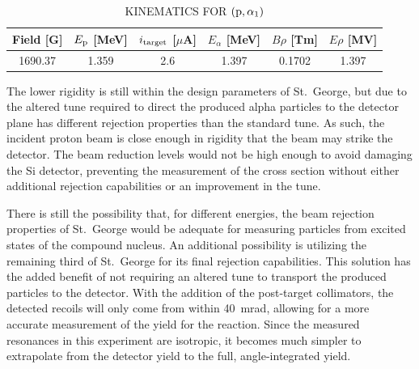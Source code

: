 \begin{table}[h]
    \begin{center}
        \caption{KINEMATICS FOR $({\rm p},\alpha_1)$}
        \label{tab:alpha-one}
        \begin{tabular}{cccccc}
            \toprule
            \midrule
            \textbf{Field [G]} & \textbf{$E_{\rm p}$ [MeV]} &
                \textbf{$i_{\rm target}$ [$\mu$A]} &
                \textbf{$E_{\alpha}$ [MeV]} & \textbf{$B\rho$ [Tm]} &
                \textbf{$E\rho$ [MV]} \\
            \midrule
                1690.37 & 1.359 & 2.6 & 1.397 & 0.1702 & 1.397 \\
            \bottomrule
        \end{tabular}
    \end{center}
\end{table}

The lower rigidity is still within the design parameters of St.\ George,
but due to the altered tune required to direct the produced alpha
particles to the detector plane has different rejection properties than
the standard tune. As such, the incident proton beam is close enough in
rigidity that the beam may strike the detector. The beam reduction
levels would not be high enough to avoid damaging the Si detector,
preventing the measurement of the cross section without either
additional rejection capabilities or an improvement in the tune.

There is still the possibility that, for different energies, the beam
rejection properties of St.\ George would be adequate for measuring
particles from excited states of the compound nucleus. An additional
possibility is utilizing the remaining third of St.\ George for its
final rejection capabilities. This solution has the added benefit of not
requiring an altered tune to transport the produced particles to the
detector. With the addition of the post-target collimators, the detected
recoils will only come from within 40~mrad, allowing for a more accurate
measurement of the yield for the reaction. Since the measured resonances
in this experiment are isotropic, it becomes much simpler to extrapolate
from the detector yield to the full, angle-integrated yield.
